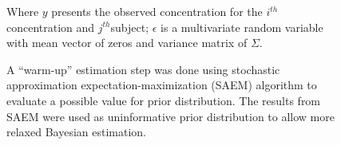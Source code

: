 \documentclass[final]{beamer}
\newlength{\sepwidth}
\newlength{\colwidth}
\newcommand{\separatorcolumn}{\begin{column}{\sepwidth}\end{column}}
\begin{document}
\begin{frame}[t]
\begin{columns}[t]
\begin{column}{\colwidth}
Where $y$ presents the observed concentration for the $i^{th}$ concentration and $j^{th}$subject; $\epsilon$ is a multivariate random variable  with mean vector of zeros and variance matrix of $\Sigma$.\par 
A “warm-up” estimation step was done using stochastic approximation expectation-maximization (SAEM) algorithm to evaluate a possible value for prior distribution. The results from SAEM were used as uninformative prior distribution to allow more relaxed Bayesian estimation. 
  
\end{column}
\separatorcolumn
\begin{column}{\colwidth}

\end{column}
\separatorcolumn
\begin{column}{\colwidth}

\end{column}
\end{columns}
\end{frame}
\end{document}
